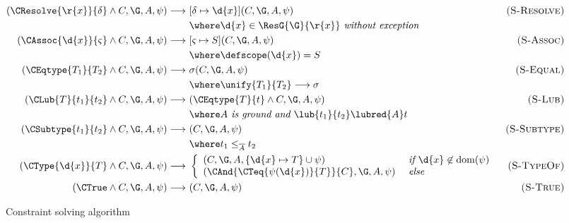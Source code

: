 \begin{figure*}[t]
  \begin{boxedminipage}{\linewidth}
  \begin{align*}
    (\CResolve{\r{x}}{\delta} \wedge C, \G, \leqa, \psi)
    \longrightarrow&\ [\delta \mapsto \d{x}](C, \G, \leqa, \psi) & \alabl{S-Resolve} \\
                   &\ \where \d{x} \in \ResG{\G}{\r{x}} \textit{ without exception} \\
    (\CAssoc{\d{x}}{\varsigma} \wedge C, \G, \leqa, \psi)
    \longrightarrow&\ [\varsigma \mapsto S](C, \G, \leqa, \psi) & \alabl{S-Assoc} \\
                   &\ \where \defscope(\d{x}) = S\\
    (\CEqtype{T_1}{T_2} \wedge C, \G, \leqa, \psi)
    \longrightarrow&\ \sigma (C, \G, \leqa, \psi) & \alabl{S-Equal} \\
                   &\ \where \unify{T_1}{T_2} \longrightarrow \sigma \\
    (\CLub{T}{t_1}{t_2} \wedge C, \G, \leqa, \psi)
    \longrightarrow&\ (\CEqtype{T}{t} \wedge C, \G, \leqa, \psi) & \alabl{S-Lub} \\
                   &\ \where \leqa\textit{ is ground and }  \lub{t_1}{t_2} \lubred{\leqa} t\\
    (\CSubtype{t_1}{t_2} \wedge C, \G, \leqa, \psi)
    \longrightarrow&\ (C, \G, \leqa, \psi) & \alabl{S-Subtype} \\
                   &\ \where t_1 \leq_{\overline{\leqa}} t_2 \\
    (\CType{\d{x}}{T} \wedge C, \G, \leqa, \psi)
    \longrightarrow&\ \left\{
      \begin{array}{ll}
        (C, \G, \leqa, \{\d{x} \mapsto T \} \cup \psi)  &\ \text{\it if } \d{x} \not\in \text{dom}(\psi) \\
        (\CAnd{\CTeq{\psi(\d{x})}{T}}{C}, \G, \leqa, \psi) & \ \text{\it else}
      \end{array}\right.
                   & \alabl{S-TypeOf} \\
    (\CTrue \wedge C, \G, \leqa, \psi)
    \longrightarrow&\ (C, \G, \leqa, \psi) & \alabl{S-True} 
  \end{align*}    
  \end{boxedminipage}
  \caption{Constraint solving algorithm}
\end{figure*}